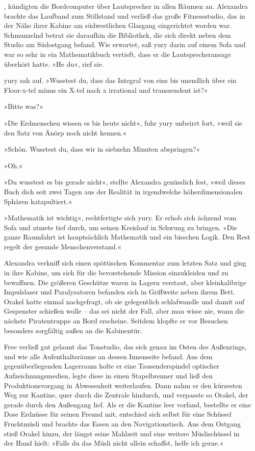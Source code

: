 , kündigten die Bordcomputer über Lautsprecher in allen Räumen an. Alexandra brachte das Laufband zum Stillstand und verließ das große Fitnessstudio, das in der Nähe ihrer Kabine am südwestlichen Glasgang eingerichtet worden war. Schmunzelnd betrat sie daraufhin die Bibliothek, die sich direkt neben dem Studio am Südostgang befand. Wie erwartet, saß yury darin auf einem Sofa und war so sehr in ein Mathematikbuch vertieft, dass er die Lautsprecheransage überhört hatte. »He du«, rief sie.

yury sah auf. »Wusstest du, dass das Integral von eins bis unendlich über ein Floor-x-tel minus ein X-tel nach x irrational und transzendent ist?«

»Bitte was?«

»Die Erdmenschen wissen es bis heute nicht«, fuhr yury unbeirrt fort, »weil sie den Satz von Änörp noch nicht kennen.«

»Schön. Wusstest du, dass wir in siebzehn Minuten abspringen?«

»Oh.«

»Du wusstest es bis gerade nicht«, stellte Alexandra genüsslich fest, »weil dieses Buch dich seit zwei Tagen aus der Realität in irgendwelche höherdimensionalen Sphären katapultiert.«

»Mathematik ist wichtig«, rechtfertigte sich yury. Er erhob sich ächzend vom Sofa und atmete tief durch, um seinen Kreislauf in Schwung zu bringen. »Die ganze Raumfahrt ist hauptsächlich Mathematik und ein bisschen Logik. Den Rest regelt der gesunde Menschenverstand.«

Alexandra verkniff sich einen spöttischen Kommentar zum letzten Satz und ging in ihre Kabine, um sich für die bevorstehende Mission einzukleiden und zu bewaffnen. Die größeren Geschütze waren in Lagern verstaut, aber kleinkalibrige Impulslaser und Paralysatoren befanden sich in Griffweite neben ihrem Bett. Orakel hatte einmal nachgefragt, ob sie gelegentlich schlafwandle und damit auf Gespenster schießen wolle – das sei nicht der Fall, aber man wisse nie, wann die nächste Piratentruppe an Bord erscheine. Seitdem klopfte er vor Besuchen besonders sorgfältig außen an die Kabinentür.

Free verließ gut gelaunt das Tonstudio, das sich genau im Osten des Außenrings, und wie alle Aufenthaltsräume an dessen Innenseite befand. Aus dem gegenüberliegenden Lagerraum holte er eine Tausenderspindel optischer Aufzeichnungsmedien, legte diese in einen Stapelbrenner und ließ den Produktionsvorgang in Abwesenheit weiterlaufen. Dann nahm er den kürzesten Weg zur Kantine, quer durch die Zentrale hindurch, und verpasste so Orakel, der gerade durch den Außengang lief. Als er die Kantine leer vorfand, bestellte er eine Dose Erdnüsse für seinen Freund mit, entschied sich selbst für eine Schüssel Fruchtmüsli und brachte das Essen an den Navigationstisch. Aus dem Ostgang stieß Orakel hinzu, der längst seine Mahlzeit und eine weitere Müslischüssel in der Hand hielt: »Falls du das Müsli nicht allein schaffst, helfe ich gerne.«

